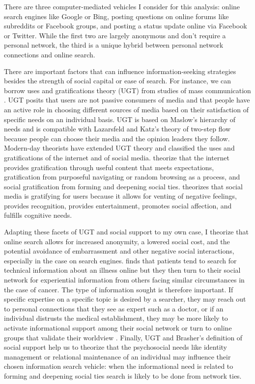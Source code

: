 There are three computer-mediated vehicles I consider for this analysis: online
search engines like Google or Bing, posting questions on online forums like
subreddits or Facebook groups, and posting a status update online via Facebook
or Twitter. While the first two are largely anonymous and don't require a
personal network, the third is a unique hybrid between personal network
connections and online search.

There are important factors that can influence information-seeking strategies
besides the strength of social capital or ease of search. For instance, we can
borrow uses and gratifications theory (UGT) from studies of mass communication
\citep{blumlerUsesMassCommunications1974, tanMassCommunicationTheories1985}
. UGT
posits that users are not passive consumers of media and that people have an
active role in choosing different sources of media based on their satisfaction
of specific needs on an individual basis. UGT is based on Maslow’s  \citeyear{maslowTheoryHumanMotivation1943} hierarchy of needs and is compatible with
Lazarsfeld and Katz’s theory of two-step flow \cite{katzPersonalInfluencePart1955}
because people can choose their media and the opinion leaders they follow.
Modern-day theorists have extended UGT theory and classified the uses and
gratifications of the internet and of social media. \citet{staffordDeterminingUsesGratifications2004} theorize that the internet
provides gratification through useful content that meets expectations,
gratification from purposeful navigating or random browsing as a process, and
social gratification from forming and deepening social ties. \citet{leungGenerationalDifferencesContent2013} theorizes that social media is
gratifying for users because it allows for venting of negative feelings,
provides recognition, provides entertainment, promotes social affection, and
fulfills cognitive needs. 

Adapting these facets of UGT and social support to my own case, I theorize that
online search allows for increased anonymity, a lowered social cost, and the
potential avoidance of embarrassment and other negative social interactions,
especially in the case on search engines. \citet{rainsCopingIllnessDigitally2018}
finds that patients tend to search for
technical information about an illness online but they then turn to their social
network for experiential information from others facing similar circumstances in
the case of cancer. The type of information sought is therefore important.
If specific expertise on a specific topic is desired by a searcher, they may
reach out to personal connections that they see as expert such as a doctor, or
if an individual distrusts the medical establishment, they may be more likely to
activate informational support among their social network or turn to online
groups that validate their worldview \citep{bogersHowSocialAre2014}. Finally, UGT and
Brasher's definition of social support \citeyearpar{brashersInformationSeekingAvoiding2002} help us to theorize that the
psychosocial needs like identity management or relational maintenance of an individual may influence their chosen information search vehicle: when the informational need is related to
forming and deepening social ties search is likely to be done from network ties.

